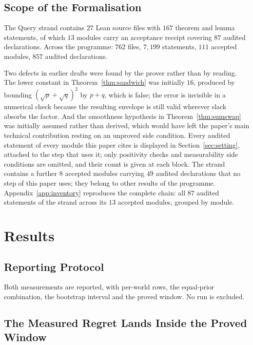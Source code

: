 \documentclass[conference]{IEEEtran}
\theoremstyle{definition}
\begin{document}
\subsection{Scope of the Formalisation}

The Query strand contains $27$ Lean source files with $167$ theorem and lemma statements,
of which $13$ modules carry an acceptance receipt covering $87$ audited declarations. Across
the programme: $762$ files, $7{,}199$ statements, $111$ accepted modules, $857$ audited
declarations.

Two defects in earlier drafts were found by the prover rather than by reading. The lower
constant in Theorem~\ref{thm:sandwich} was initially $16$, produced by bounding
$(\sqrt{p}+\sqrt{q})^{2}$ by $p+q$, which is false; the error is invisible in a numerical
check because the resulting envelope is still valid wherever slack absorbs the factor. And the
smoothness hypothesis in Theorem~\ref{thm:sumswap} was initially assumed rather than derived,
which would have left the paper's main technical contribution resting on an unproved side
condition. Every audited statement of every module this paper cites is displayed in Section~\ref{sec:setting}, attached to the step that uses it; only positivity checks and measurability side conditions are omitted, and their count is given at each block. The strand contains a further $8$ accepted modules carrying $49$ audited declarations that no step of this paper uses; they belong to other results of the programme. Appendix~\ref{app:inventory} reproduces the complete chain: all $87$ audited statements of the strand across its $13$ accepted modules, grouped by module.

\section{Results}
\label{sec:results}

\subsection{Reporting Protocol}

Both measurements are reported, with per-world rows, the equal-prior combination, the
bootstrap interval and the proved window. No run is excluded.

\subsection{The Measured Regret Lands Inside the Proved Window}
\end{document}
